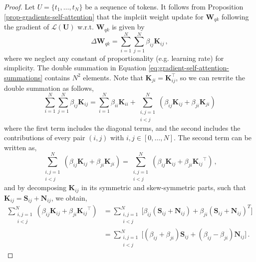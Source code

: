 \begin{proof}
%
%
Let $U = \{t_1, \dots, t_N\}$ be a sequence of tokens.
%
It follows from Proposition \ref{prop-gradients-self-attention} that the implciit weight update for $\bm{W}_{qk}$ following the gradient of $\mathcal{L}(\bm{U})$ w.r.t. $\bm{W}_{qk}$ is given by
%
\begin{equation}
\label{eq:gradient-self-attention-summations}
    \Delta \bm{W}_{qk} = \sum_{i =1}^N \sum_{j=1}^N \beta_{ij} \bm{K}_{ij} \,,
\end{equation}
%
where we neglect any constant of proportionality (e.g. learning rate) for simplicity.
%
The double summation in Equation \eqref{eq:gradient-self-attention-summations} contains $N^2$ elements.
%
Note that \( \bm{K}_{ji} = \bm{K}_{ij}^\top \), so we can rewrite the double summation as follows,
%
\begin{equation}
\sum_{i = 1}^N \sum_{j =1}^N \beta_{ij} \bm{K}_{ij} =
\sum_{i =1}^N \beta_{ii} \bm{K}_{ii} +
\sum_{\substack{i,j = 1 \\ i < j}}^N(\beta_{ij} \bm{K}_{ij} + \beta_{ji} \bm{K}_{ji})
\end{equation}
%
where the first term includes the diagonal terms, and the second includes the contributions of every pair $(i,j)$ with $i,j \in [0, \dots, N]$.
%
The second term can be written as,
%
\begin{equation}
 \sum_{\substack{i,j = 1 \\ i < j}}^N (\beta_{ij} \bm{K}_{ij} + \beta_{ji} \bm{K}_{ji}) = \sum_{\substack{i,j = 1 \\ i < j}}^N(\beta_{ij} \bm{K}_{ij} + \beta_{ji} {\bm{K}_{ij}}^\top) \,, 
\end{equation}
%
and by decomposing $\bm{K}_{ij}$ in its symmetric and skew-symmetric parts, such that $\bm{K}_{ij} = \bm{S}_{ij} + \bm{N}_{ij}$, we obtain,
%
\begin{equation}
\label{eq:gradients-symmetric-terms}
\begin{split}
    \sum_{\substack{i,j = 1 \\ i < j}}^N (\beta_{ij} \bm{K}_{ij} + \beta_{ji} {\bm{K}_{ij}}^\top)
    & = \sum_{\substack{i,j = 1 \\ i < j}}^N \big[ \beta_{ij}(\bm{S}_{ij} + \bm{N}_{ij}) + \beta_{ji}(\bm{S}_{ij} + \bm{N}_{ij})^T \big] \\
    & = \sum_{\substack{i,j = 1 \\ i < j}}^N \big[(\beta_{ij} + \beta_{ji})\bm{S}_{ij} + (\beta_{ij} - \beta_{ji})\bm{N}_{ij}\big]\,.
\end{split}

\end{equation}
\end{proof}
